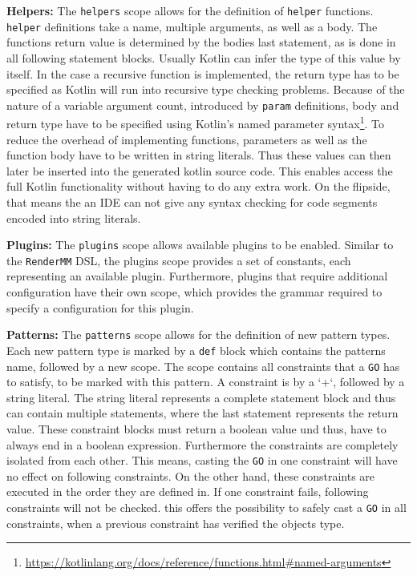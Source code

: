 \textbf{Helpers:} The \texttt{helpers} scope allows for the definition of \texttt{helper} functions. \texttt{helper} definitions take a name, multiple arguments, as well as a body. The functions return value is determined by the bodies last statement, as is done in all following statement blocks. Usually Kotlin can infer the type of this value by itself. In the case a recursive function is implemented, the return type has to be specified as Kotlin will run into recursive type checking problems. Because of the nature of a variable argument count, introduced by \texttt{param} definitions, body and return type have to be specified using Kotlin's named parameter syntax\footnote{\url{https://kotlinlang.org/docs/reference/functions.html\#named-arguments}}. To reduce the overhead of implementing functions, parameters as well as the function body have to be written in string literals. Thus these values can then later be inserted into the generated kotlin source code. This enables access the full Kotlin functionality without having to do any extra work. On the flipside, that means the an IDE can not give any syntax checking for code segments encoded into string literals.

\textbf{Plugins:} The \texttt{plugins} scope allows available plugins to be enabled. Similar to the \texttt{RenderMM} DSL, the plugins scope provides a set of constants, each representing an available plugin. Furthermore, plugins that require additional configuration have their own scope, which provides the grammar required to specify a configuration for this plugin.

\textbf{Patterns:} The \texttt{patterns} scope allows for the definition of new pattern types. Each new pattern type is marked by a \texttt{def} block which contains the patterns name, followed by a new scope. The scope contains all constraints that a \texttt{GO} has to satisfy, to be marked with this pattern. A constraint is by a `+`, followed by a string literal. The string literal represents a complete statement block and thus can contain multiple statements, where the last statement represents the return value. These constraint blocks must return a boolean value und thus, have to always end in a boolean expression. Furthermore the constraints are completely isolated from each other. This means, casting the \texttt{GO} in one constraint will have no effect on following constraints. On the other hand, these constraints are executed in the order they are defined in. If one constraint fails, following constraints will not be checked. this offers the possibility to safely cast a \texttt{GO} in all constraints, when a previous constraint has verified the objects type.

